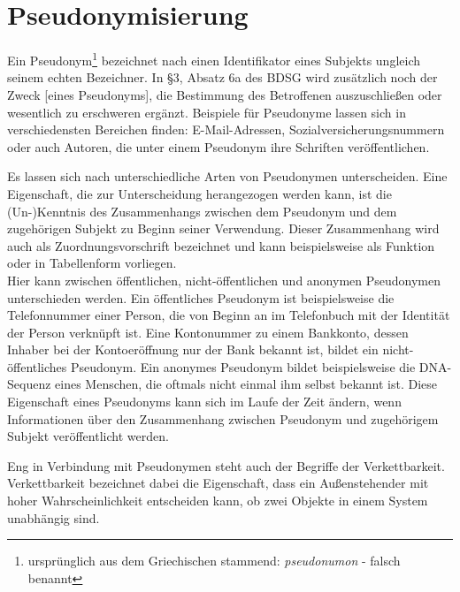 \section{Pseudonymisierung}

\label{sec_basics_pseudonymity}

Ein Pseudonym\footnote{
	ursprünglich aus dem Griechischen stammend: \textit{pseudonumon} - falsch benannt
} bezeichnet nach \cite{pfitzmann2010} einen Identifikator eines Subjekts ungleich seinem echten Bezeichner. In §3, Absatz 6a des BDSG wird zusätzlich noch der \glqq Zweck [eines Pseudonyms], die Bestimmung des Betroffenen auszuschließen oder wesentlich zu erschweren\grqq{}\cite{TODO} ergänzt. Beispiele für Pseudonyme lassen sich in verschiedensten Bereichen finden: E-Mail-Adressen, Sozialversicherungsnummern oder auch Autoren, die unter einem Pseudonym ihre Schriften veröffentlichen.

Es lassen sich nach \cite{pfitzmann1990} unterschiedliche Arten von Pseudonymen unterscheiden. Eine Eigenschaft, die zur Unterscheidung herangezogen werden kann, ist die (Un-)Kenntnis des Zusammenhangs zwischen dem Pseudonym und dem zugehörigen Subjekt zu Beginn seiner Verwendung. Dieser Zusammenhang wird auch als Zuordnungsvorschrift bezeichnet und kann beispielsweise als Funktion oder in Tabellenform vorliegen.\\
Hier kann zwischen öffentlichen, nicht-öffentlichen und anonymen Pseudonymen unterschieden werden. Ein öffentliches Pseudonym ist beispielsweise die Telefonnummer einer Person, die von Beginn an im Telefonbuch mit der Identität der Person verknüpft ist. Eine Kontonummer zu einem Bankkonto, dessen Inhaber bei der Kontoeröffnung nur der Bank bekannt ist, bildet ein nicht-öffentliches Pseudonym. Ein anonymes Pseudonym bildet beispielsweise die DNA-Sequenz eines Menschen, die oftmals nicht einmal ihm selbst bekannt ist. Diese Eigenschaft eines Pseudonyms kann sich im Laufe der Zeit ändern, wenn Informationen über den Zusammenhang zwischen Pseudonym und zugehörigem Subjekt veröffentlicht werden.

Eng in Verbindung mit Pseudonymen steht auch der Begriffe der Verkettbarkeit. 
Verkettbarkeit bezeichnet dabei die Eigenschaft, dass ein Außenstehender mit hoher Wahrscheinlichkeit entscheiden kann, ob zwei Objekte in einem System unabhängig sind\cite{pfitzmann2010}.

